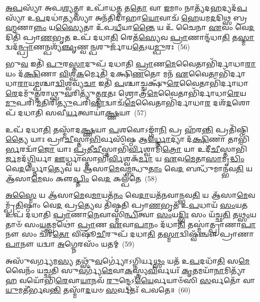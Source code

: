 \-\ul{𑌅}\-\-\ul{𑌪}\-𑌸𑍍𑌯𑌾᳴ 𑌅𑌪\-\ul{𑌶𑍍𑌯}\-𑌤𑍍𑌤𑌾 𑌉𑌪𑌾᳴𑌧\-\ul{𑌤𑍍𑌤} 𑌤\-\ul{𑌤𑍋} 𑌵𑌾 \ul{𑌇}\-𑌮𑌾𑌂 𑌨𑌾𑌤𑍍𑌯᳴𑌦\-\ul{𑌹}\-𑌦𑍍𑌯𑌦᳴\-\ul{𑌪}\-𑌸𑍍𑌯𑌾᳴ 𑌉\-\ul{𑌪}\-𑌦𑌧𑌾॑\-\ul{𑌤𑍍𑌯}\-𑌸𑍍𑌯𑌾 𑌅𑌨᳴𑌤𑌿𑌦𑌾𑌹𑌾\-\ul{𑌯𑍋}\-𑌵𑌾𑌚᳴ \ul{𑌹𑍇}\-𑌯𑌮\-\ul{𑌦}\-𑌦𑌿𑌥𑍍𑌸 𑌬𑍍𑌰\-\ul{𑌹𑍍𑌮}\-𑌣𑌾\-\ul{𑌨𑍍𑌨𑌂} 𑌯\-\ul{𑌸𑍍𑌯𑍈}\-𑌤𑌾 𑌉᳴𑌪\-\ul{𑌧𑍀}\-𑌯𑌾\-\ul{𑌨𑍍𑌤𑍈} 𑌯 𑌉᳴ 𑌚𑍈𑌨𑌾 \ul{𑌏}\-𑌵𑌂 𑌵𑍇\-\ul{𑌦}\-𑌦𑌿𑌤𑌿᳴ 𑌪𑍍𑌰𑌾\-\ul{𑌣}\-𑌭𑍃\-\ul{𑌤} 𑌉𑌪᳴ 𑌦𑌧𑌾\-\ul{𑌤𑌿} 𑌰𑍇𑌤᳴\-\ul{𑌸𑍍𑌯𑍇}\-𑌵 \ul{𑌪𑍍𑌰𑌾}\-𑌣𑌾𑌨𑍍𑌦᳴𑌧𑌾\-\ul{𑌤𑌿} 𑌤\-\ul{𑌸𑍍𑌮𑌾}\-𑌦𑍍𑌵𑌦᳴\-\ul{𑌨𑍍𑌪𑍍𑌰𑌾}\-𑌣𑌨𑍍𑌪𑌶𑍍𑌯᳴\-\ul{𑌞𑍍𑌛𑍃}\-𑌣𑍍𑌵\-\ul{𑌨𑍍𑌪}\-𑌶𑍁𑌰𑍍𑌜𑌾᳴𑌯\-\ul{𑌤𑍇}\-\-𑌽𑌯\-\ul{𑌮𑍍𑌪𑍁}\-𑌰𑌃~(56)

𑌭𑍁\-\ul{𑌵} 𑌇𑌤𑌿᳴ \ul{𑌪𑍁}\-𑌰\-\ul{𑌸𑍍𑌤𑌾}\-𑌦𑍁𑌪᳴ 𑌦𑌧𑌾𑌤𑌿 \ul{𑌪𑍍𑌰𑌾}\-𑌣\-\ul{𑌮𑍇}\-𑌵𑍈𑌤𑌾𑌭𑌿᳴𑌰𑍍𑌦𑌾𑌧𑌾\-\ul{𑌰𑌾}\-𑌯𑌂 𑌦᳴\-\ul{𑌕𑍍𑌷𑌿}\-𑌣𑌾 \ul{𑌵𑌿}\-𑌶𑍍𑌵\-\ul{𑌕}\-𑌰𑍍𑌮𑍇𑌤𑌿᳴ 𑌦𑌕𑍍𑌷𑌿\-\ul{𑌣}\-𑌤𑍋 𑌮𑌨᳴ \ul{𑌏}\-𑌵𑍈𑌤𑌾𑌭𑌿᳴𑌰𑍍𑌦𑌾𑌧𑌾\-\ul{𑌰𑌾}\-𑌯\-\ul{𑌮𑍍𑌪}\-𑌶𑍍𑌚𑌾\-\ul{𑌦𑍍𑌵𑌿}\-𑌶𑍍𑌵𑌵𑍍𑌯᳴\-\ul{𑌚𑌾} 𑌇𑌤𑌿᳴ \ul{𑌪}\-𑌶𑍍𑌚𑌾𑌚𑍍𑌚𑌕𑍍𑌷𑍁᳴\-\ul{𑌰𑍇}\-𑌵𑍈𑌤𑌾𑌭𑌿᳴𑌰𑍍𑌦𑌾𑌧𑌾\-\ul{𑌰𑍇}\-𑌦𑌮𑍁᳴\-\ul{𑌤𑍍𑌤}\-𑌰𑌾𑌥𑍍𑌸𑍁\-\ul{𑌵}\-𑌰𑌿𑌤𑍍𑌯𑍁᳴𑌤𑍍𑌤\-\ul{𑌰}\-𑌤𑌃 𑌶𑍍𑌰𑍋𑌤𑍍𑌰᳴\-\ul{𑌮𑍇}\-𑌵𑍈𑌤𑌾𑌭𑌿᳴𑌰𑍍𑌦𑌾𑌧𑌾\-\ul{𑌰𑍇}\-𑌯\-\ul{𑌮𑍁}\-𑌪𑌰𑌿᳴ \ul{𑌮}\-𑌤𑌿𑌰𑌿\-\ul{𑌤𑍍𑌯𑍁}\-𑌪𑌰𑌿᳴\-\ul{𑌷𑍍𑌟𑌾}\-𑌦𑍍𑌵𑌾𑌚᳴\-\ul{𑌮𑍇}\-𑌵𑍈𑌤𑌾𑌭𑌿᳴𑌰𑍍𑌦𑌾𑌧𑌾\-\ul{𑌰} 𑌦𑌶᳴\-\ul{𑌦}\-𑌶𑍋𑌪᳴ 𑌦𑌧𑌾𑌤𑌿 𑌸𑌵𑍀\-\ul{𑌰𑍍𑌯}\-𑌤𑍍𑌵𑌾𑌯𑌾॑\-\ul{𑌕𑍍𑌷𑍍𑌣}\-𑌯𑌾~(57)

𑌉𑌪᳴ 𑌦𑌧𑌾\-\ul{𑌤𑌿} 𑌤𑌸𑍍𑌮𑌾᳴𑌦\-\ul{𑌕𑍍𑌷𑍍𑌣}\-𑌯𑌾 \ul{𑌪}\-𑌶𑌵𑍋\-𑌽𑌙𑍍𑌗𑌾᳴\-\ul{𑌨𑌿} 𑌪𑍍𑌰 𑌹᳴𑌰\-\ul{𑌨𑍍𑌤𑌿} 𑌪𑍍𑌰𑌤𑌿᳴𑌷𑍍𑌠𑌿\-\ul{𑌤𑍍𑌯𑍈} 𑌯𑌾𑌃 𑌪𑍍𑌰𑌾\-\ul{𑌚𑍀}\-𑌸𑍍𑌤𑌾\-\ul{𑌭𑌿}\-𑌰𑍍𑌵𑌸𑌿᳴𑌷𑍍𑌠 𑌆\-\ul{𑌰𑍍𑌧𑍍𑌨𑍋}\-𑌦𑍍𑌯𑌾 𑌦᳴\-\ul{𑌕𑍍𑌷𑌿}\-𑌣𑌾 𑌤𑌾𑌭𑌿᳴\-\ul{𑌰𑍍𑌭}\-𑌰𑌦𑍍𑌵𑌾᳴\-\ul{𑌜𑍋} 𑌯𑌾𑌃 \ul{𑌪𑍍𑌰}\-𑌤𑍀\-\ul{𑌚𑍀}\-𑌸𑍍𑌤𑌾𑌭𑌿᳴\-\ul{𑌰𑍍𑌵𑌿}\-𑌶𑍍𑌵𑌾𑌮𑌿᳴\-\ul{𑌤𑍍𑌰𑍋} 𑌯𑌾 𑌉𑌦𑍀᳴\-\ul{𑌚𑍀}\-𑌸𑍍𑌤𑌾𑌭𑌿᳴\-\ul{𑌰𑍍𑌜}\-𑌮𑌦᳴\-\ul{𑌗𑍍𑌨𑌿}\-𑌰𑍍𑌯𑌾 \ul{𑌊}\-𑌰𑍍𑌧𑍍𑌵𑌾𑌸𑍍𑌤𑌾𑌭𑌿᳴\-\ul{𑌰𑍍𑌵𑌿}\-𑌶𑍍𑌵𑌕᳴\-\ul{𑌰𑍍𑌮𑌾} 𑌯 \ul{𑌏}\-𑌵\-\ul{𑌮𑍇}\-𑌤𑌾\-\ul{𑌸𑌾}\-𑌮𑍃\-\ul{𑌦𑍍𑌧𑌿𑌂} 𑌵𑍇\-\ul{𑌦}\-𑌰𑍍𑌧𑍍𑌨𑍋\-\ul{𑌤𑍍𑌯𑍇}\-𑌵 𑌯 𑌆᳴𑌸𑌾\-\ul{𑌮𑍇}\-𑌵\-\ul{𑌮𑍍𑌬}\-𑌨𑍍𑌧𑍁\-\ul{𑌤𑌾𑌂} 𑌵𑍇\-\ul{𑌦} 𑌬𑌨𑍍𑌧𑍁᳴𑌮𑌾𑌨𑍍𑌭𑌵\-\ul{𑌤𑌿} 𑌯 𑌆᳴𑌸𑌾\-\ul{𑌮𑍇}\-𑌵𑌂 𑌕𑍢\-\ul{𑌪𑍍𑌤𑌿𑌂} 𑌵𑍇\-\ul{𑌦} 𑌕𑌲𑍍𑌪᳴𑌤𑍇~(58)

\-\ul{𑌅}\-\-\ul{𑌸𑍍𑌮𑍈} 𑌯 𑌆᳴𑌸𑌾\-\ul{𑌮𑍇}\-𑌵\-\ul{𑌮𑌾}\-𑌯𑌤᳴\-\ul{𑌨𑌂} 𑌵𑍇\-\ul{𑌦𑌾}\-𑌯𑌤᳴𑌨𑌵𑌾𑌨𑍍𑌭𑌵\-\ul{𑌤𑌿} 𑌯 𑌆᳴𑌸𑌾\-\ul{𑌮𑍇}\-𑌵𑌮𑍍𑌪𑍍𑌰᳴\-\ul{𑌤𑌿}\-𑌷𑍍𑌠𑌾𑌂 𑌵𑍇\-\ul{𑌦} 𑌪𑍍𑌰\-\ul{𑌤𑍍𑌯𑍇}\-𑌵 𑌤𑌿᳴𑌷𑍍𑌠𑌤𑌿 𑌪𑍍𑌰𑌾\-\ul{𑌣}\-𑌭𑍃𑌤᳴ 𑌉\-\ul{𑌪}\-𑌧𑌾𑌯᳴ \ul{𑌸𑌂}\-𑌯\-\ul{𑌤} 𑌉𑌪᳴ 𑌦𑌧𑌾𑌤𑌿 \ul{𑌪𑍍𑌰𑌾}\-𑌣𑌾\-\ul{𑌨𑍇}\-𑌵𑌾𑌸𑍍𑌮𑌿᳴\-\ul{𑌨𑍍𑌧𑌿}\-𑌤𑍍𑌵𑌾 \ul{𑌸𑌂}\-𑌯\-\ul{𑌦𑍍𑌭𑌿𑌃} 𑌸𑌂 𑌯᳴𑌚𑍍𑌛\-\ul{𑌤𑌿} 𑌤\-\ul{𑌥𑍍𑌸𑌂}\-𑌯𑌤𑌾𑍞᳴ 𑌸𑌂\-\ul{𑌯}\-𑌤𑍍𑌤𑍍𑌵𑌮𑌥𑍋॑ \ul{𑌪𑍍𑌰𑌾}\-𑌣 \ul{𑌏}\-𑌵𑌾\-\ul{𑌪𑌾}\-𑌨𑌂 𑌦᳴𑌧𑌾\-\ul{𑌤𑌿} 𑌤𑌸𑍍𑌮𑌾॑𑌤𑍍𑌪𑍍𑌰𑌾𑌣𑌾\-\ul{𑌪𑌾}\-𑌨𑍗 𑌸𑌂 𑌚᳴𑌰\-\ul{𑌤𑍋} 𑌵𑌿𑌷𑍂᳴\-\ul{𑌚𑍀}\-𑌰𑍁𑌪᳴ 𑌦𑌧𑌾\-\ul{𑌤𑌿} 𑌤\-\ul{𑌸𑍍𑌮𑌾}\-𑌦𑍍𑌵𑌿𑌷𑍍𑌵᳴𑌞𑍍𑌚𑍗 𑌪𑍍𑌰𑌾𑌣𑌾\-\ul{𑌪𑌾}\-𑌨𑍗 𑌯𑌦𑍍𑌵𑌾 \ul{𑌅}\-𑌗𑍍𑌨𑍇𑌰𑌸𑌂᳴ 𑌯𑌤𑌮𑍍~(59)

𑌅𑌸𑍁᳴𑌵𑌰𑍍𑌗𑍍𑌯𑌮\-\ul{𑌸𑍍𑌯} 𑌤𑌥𑍍𑌸𑍁᳴\-\ul{𑌵}\-𑌰𑍍𑌗𑍍𑌯𑍋॑\-𑌽𑌗𑍍𑌨𑌿𑌰𑍍𑌯\-\ul{𑌥𑍍𑌸𑌂} 𑌯𑌤᳴ 𑌉\-\ul{𑌪}\-𑌦𑌧𑌾᳴\-\ul{𑌤𑌿} 𑌸\-\ul{𑌮𑍇}\-𑌵𑍈𑌨𑌂᳴ 𑌯𑌚𑍍𑌛𑌤𑌿 𑌸𑍁\-\ul{𑌵}\-𑌰𑍍𑌗𑍍𑌯᳴\-\ul{𑌮𑍇}\-𑌵𑌾\-\ul{𑌕}\-𑌸𑍍𑌤𑍍𑌰𑍍𑌯\-\ul{𑌵𑌿}\-𑌰𑍍𑌵𑌯𑌃᳴ \ul{𑌕𑍃}\-𑌤𑌮𑌯𑌾᳴\-\ul{𑌨𑌾}\-𑌮𑌿𑌤𑍍𑌯𑌾᳴\-\ul{𑌹} 𑌵𑌯𑍋᳴𑌭𑌿\-\ul{𑌰𑍇}\-𑌵𑌾\-\ul{𑌯𑌾}\-𑌨𑌵᳴ \ul{𑌰𑍁}\-𑌨𑍍𑌦𑍍𑌧𑍇\-𑌽\-\ul{𑌯𑍈}\-𑌰𑍍𑌵𑌯𑌾𑍞᳴𑌸𑌿 \ul{𑌸}\-𑌰𑍍𑌵𑌤𑍋᳴ 𑌵𑌾\-\ul{𑌯𑍁}\-𑌮𑌤𑍀॑𑌰𑍍𑌭𑌵\-\ul{𑌨𑍍𑌤𑌿} 𑌤𑌸𑍍𑌮𑌾᳴\-\ul{𑌦}\-𑌯𑍞 \ul{𑌸}\-𑌰𑍍𑌵𑌤𑌃᳴ 𑌪𑌵𑌤𑍇॥~(60)

